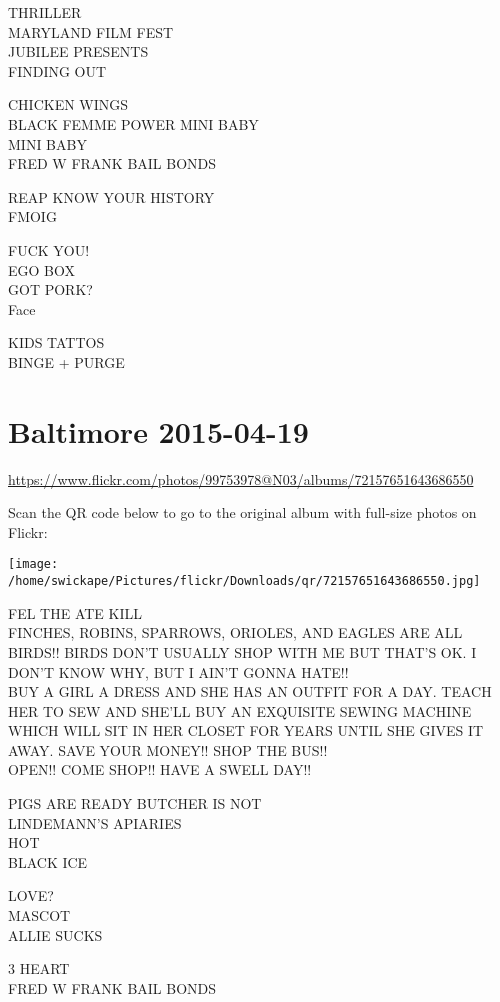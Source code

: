 \documentclass[10pt,letterpaper]{article}
\begin{document}
THRILLER\\
MARYLAND FILM FEST\\
JUBILEE PRESENTS\\
FINDING OUT

CHICKEN WINGS\\
BLACK FEMME POWER MINI BABY\\
MINI BABY\\
FRED W FRANK BAIL BONDS

REAP KNOW YOUR HISTORY\\
FMOIG

FUCK YOU!\\
EGO BOX\\
GOT PORK?\\
Face

KIDS TATTOS\\
BINGE + PURGE
\pagebreak

\section*{Baltimore 2015-04-19}

\url{https://www.flickr.com/photos/99753978@N03/albums/72157651643686550}

Scan the QR code below to go to the original album with full-size photos on Flickr:

\texttt{[image: /home/swickape/Pictures/flickr/Downloads/qr/72157651643686550.jpg]}
\pagebreak

FEL THE ATE KILL\\
FINCHES, ROBINS, SPARROWS, ORIOLES, AND EAGLES ARE ALL BIRDS!!  BIRDS DON'T USUALLY SHOP WITH ME BUT THAT'S OK.  I DON'T KNOW WHY, BUT I AIN'T GONNA HATE!!\\
BUY A GIRL A DRESS AND SHE HAS AN OUTFIT FOR A DAY.  TEACH HER TO SEW AND SHE'LL BUY AN EXQUISITE SEWING MACHINE WHICH WILL SIT IN HER CLOSET FOR YEARS UNTIL SHE GIVES IT AWAY.  SAVE YOUR MONEY!! SHOP THE BUS!!\\
OPEN!! COME SHOP!! HAVE A SWELL DAY!!

PIGS ARE READY BUTCHER IS NOT\\
LINDEMANN'S APIARIES\\
HOT\\
BLACK ICE

LOVE?\\
MASCOT\\
ALLIE SUCKS

3 HEART\\
FRED W FRANK BAIL BONDS
\end{document}
